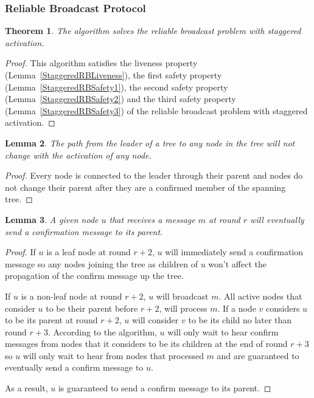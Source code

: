 \documentclass[english]{article}
\newtheorem{theorem}{Theorem}[section]
\newtheorem{lemma}[theorem]{Lemma}
\begin{document}
\subsubsection{Reliable Broadcast Protocol}

\begin{theorem}
\label{StaggeredReliableBroadcast}
  The algorithm solves the reliable broadcast problem with staggered activation.
\end{theorem}
\begin{proof}
This algorithm satisfies the liveness property (Lemma~\ref{StaggeredRBLiveness}), 
the first safety property (Lemma~\ref{StaggeredRBSafety1}),
the second safety property (Lemma~\ref{StaggeredRBSafety2}) and 
the third safety property (Lemma~\ref{StaggeredRBSafety3}) of the reliable broadcast problem with staggered activation.
\end{proof}

\begin{lemma}
\label{StaggeredStablePath}
The path from the leader of a tree to any node in the tree will not change with the activation of any node.
\end{lemma}
\begin{proof}
Every node is connected to the leader through their parent and nodes do not change their parent after they are a confirmed member of the spanning tree.
\end{proof}

\begin{lemma}
\label{StaggeredSpanningTreePropagation}
A given node $u$ that receives a message $m$ at round $r$ will eventually send a confirmation message to its parent. 
\end{lemma}
\begin{proof}

 If $u$ is a leaf node at round $r+2$, $u$ will immediately send a confirmation message so any nodes joining the tree as children of $u$ won't affect the propagation of the confirm message up the tree. 

If $u$ is a non-leaf node at round $r+2$, $u$ will broadcast $m$. All active nodes that consider $u$ to be their parent before $r+2$, will process $m$. If a node $v$ considers $u$ to be its parent at round $r+2$, $u$ will consider $v$ to be its child no later than round $r+3$. According to the algorithm, $u$ will only wait to hear confirm messages from nodes that it considers to be its children at the end of round $r+3$ so $u$ will only wait to hear from nodes that processed $m$ and are guaranteed to eventually send a confirm message to $u$. 

As a result, $u$ is guaranteed to send a confirm message to its parent. 

\end{proof}
\end{document}
